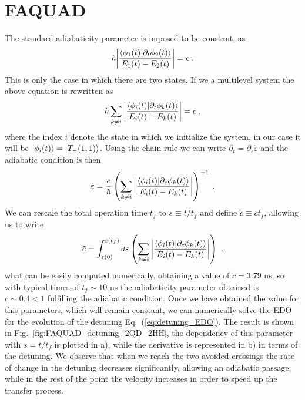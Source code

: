 \documentclass[a4paper,11pt]{article}
\begin{document}
\section{FAQUAD}
The standard adiabaticity parameter is imposed to be constant, as
\begin{equation}
	\hbar\abs{\frac{\braket{\phi_1(t)}{\partial_t\phi_2(t)}}{E_1(t)-E_2(t)}}=c\; .
\end{equation}
This is only the case in which there are two states. If we a multilevel system the above equation is rewritten as
\begin{equation}
	\hbar \sum _{k\neq i}\abs{\frac{\braket{\phi_i(t)}{\partial_t\phi_k(t)}}{E_i(t)-E_k(t)}}=c\; ,
\end{equation}
where the index $i$ denote the state in which we initialize the system, in our case it will be $\ket{\phi_i(t)}=\ket{T_-(1,1)}$. Using the chain rule we can write $\partial_t=\partial_\varepsilon \dot{\varepsilon}$ and the adiabatic condition is then
\begin{equation}
	\dot{\varepsilon}=\frac{c}{\hbar}\left(\sum _{k\neq i}\abs{\frac{\braket{\phi_i(t)}{\partial_\varepsilon\phi_k(t)}}{E_i(t)-E_k(t)}}\right)^{-1}\; .
	\label{eq:detuning_EDO}
\end{equation}
We can rescale the total operation time $t_f$ to $s\equiv t/t_f$ and define $\tilde{c}\equiv ct_f$, allowing us to write
\begin{equation}
	\tilde{c}=\int_{\varepsilon(0)}^{\varepsilon(t_f)}d\varepsilon\left(\sum _{k\neq i}\abs{\frac{\braket{\phi_i(t)}{\partial_\varepsilon\phi_k(t)}}{E_i(t)-E_k(t)}}\right)\; , 
\end{equation}
what can be easily computed numerically, obtaining a value of $\tilde{c}=3.79$ ns, so with typical times of $t_f\sim 10$ ns the adiabaticity parameter obtained is $c\sim 0.4< 1$ fulfilling the adiabatic condition. Once we have obtained the value for this parameters, which will remain constant, we can numerically solve the EDO for the evolution of the detuning Eq.~(\ref{eq:detuning_EDO}). The result is shown in Fig.~\ref{fig:FAQUAD_detuning_2QD_2HH}, the dependency of this parameter with $s=t/t_f$ is plotted in a), while the derivative is represented in b) in terms of the detuning. We observe that when we reach the two avoided crossings the rate of change in the detuning decreases significantly, allowing an adiabatic passage, while in the rest of the point the velocity increases in order to speed up the transfer process.
\end{document}
